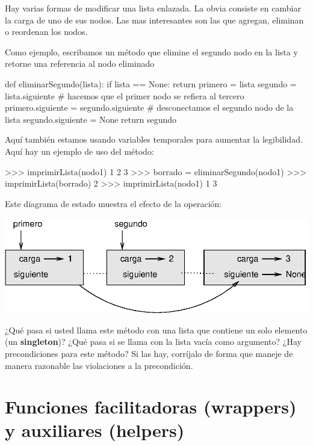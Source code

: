  

Hay varias formas de modificar una lista enlazada. La obvia consiste
en cambiar la carga de uno de sus nodos. Las mas interesantes son
las que agregan, eliminan o reordenan los nodos.

Como ejemplo, escribamos un método que elimine el segundo nodo en
la lista y retorne una referencia al nodo eliminado

\beforeverb 
\begin{pythoncode}
def eliminarSegundo(lista):
  if lista == None: 
     return
  primero = lista
  segundo = lista.siguiente
  # hacemos que el primer nodo se refiera al tercero
  primero.siguiente = segundo.siguiente
  # desconectamos el segundo nodo de la lista
  segundo.siguiente = None
  return segundo
\end{pythoncode}
\afterverb Aquí también estamos usando variables temporales para
aumentar la legibilidad. Aquí hay un ejemplo de uso del método:

\beforeverb 
\begin{pyconcode}
>>> imprimirLista(nodo1)
1 2 3
>>> borrado = eliminarSegundo(nodo1)
>>> imprimirLista(borrado)
2
>>> imprimirLista(nodo1)
1 3
\end{pyconcode}
\afterverb Este diagrama de estado muestra el efecto de la operación:

\beforefig \centerline{\includegraphics{illustrations/link5}}
\afterfig

¿Qué pasa si usted llama este método con una lista que contiene un
solo elemento (un \textbf{singleton})? ¿Qué pasa si se llama con la
lista vacía como argumento? ¿Hay precondiciones para este método?
Si las hay, corríjalo de forma que maneje de manera razonable las
violaciones a la precondición.


\section{Funciones facilitadoras (wrappers) y auxiliares (helpers)}

